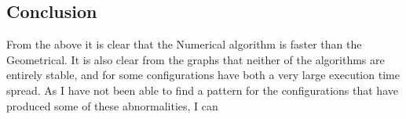 \subsection{Conclusion}

From the above it is clear that the Numerical algorithm is faster than the Geometrical. It is also clear from the graphs that neither of the algorithms are entirely stable, and for some configurations have both a very large execution time spread. As I have not been able to find a pattern for the configurations that have produced some of these abnormalities, I can 
